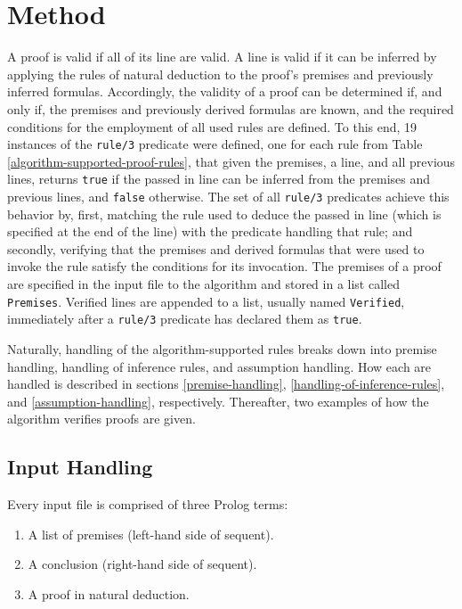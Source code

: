 \documentclass[a4paper, 11pt]{article}
\begin{document}
   \section{Method}
   
   A proof is valid if all of its line are valid. A line is
   valid if it can be inferred by applying the rules of
   natural deduction to the proof's premises and previously
   inferred formulas. Accordingly, the validity of a proof can
   be determined if, and only if, the premises and previously
   derived formulas are known, and the required conditions for
   the employment of all used rules are defined. To this end,
   19 instances of the \texttt{rule/3} predicate were defined,
   one for each rule from Table 
   \ref{algorithm-supported-proof-rules}, that given the
   premises, a line, and all previous lines, returns 
   \texttt{true} if the passed in line can be inferred from
   the premises and previous lines, and \texttt{false}
   otherwise. The set of all \texttt{rule/3} predicates 
   achieve this behavior by, first, matching the rule used to
   deduce the passed in line (which is specified at the end 
   of the line) with the predicate handling that rule; and
   secondly, verifying that the premises and derived formulas 
   that were used to invoke the rule satisfy the conditions 
   for its invocation. The premises of a proof are specified
   in the input file to the algorithm and stored in a list
   called \texttt{Premises}. Verified lines are appended to a 
   list, usually named \texttt{Verified}, immediately after a
   \texttt{rule/3} predicate has declared them as
   \texttt{true}.
   \bigbreak

   Naturally, handling of the algorithm-supported rules breaks
   down into premise handling, handling of inference rules,
   and assumption handling. How each are handled is
   described in sections 
   \ref{premise-handling},
   \ref{handling-of-inference-rules}, and
   \ref{assumption-handling}, respectively. 
   Thereafter, two examples of how the algorithm verifies
   proofs are given.

   \subsection{Input Handling}
   \label{input-handling}
   
   Every input file is comprised of three Prolog terms:
   \begin{enumerate}
      \item A list of premises (left-hand side of sequent).
      \item A conclusion (right-hand side of sequent).
      \item A proof in natural deduction.
   \end{enumerate}
\end{document}
